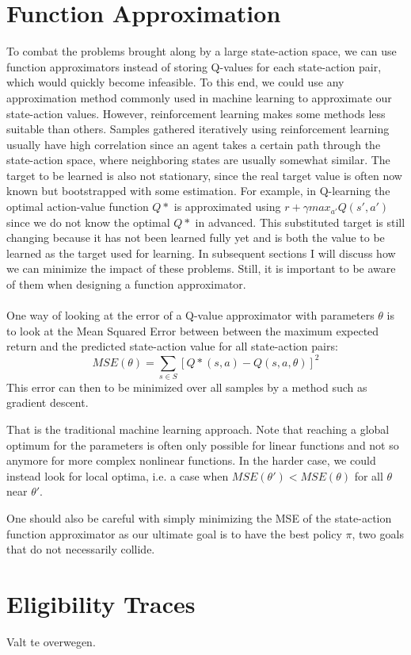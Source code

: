 \section{Function Approximation}
To combat the problems brought along by a large state-action space,
we can use function approximators instead of storing Q-values
for each state-action pair,
which would quickly become infeasible.
To this end,
we could use any approximation method commonly used in machine learning
to approximate our state-action values.
However, reinforcement learning makes some methods
less suitable than others.
Samples gathered iteratively using reinforcement learning
usually have high correlation since an agent
takes a certain path through
the state-action space,
where neighboring states are usually somewhat similar.
The target to be learned is also not stationary,
since the real target value is often now known
but bootstrapped with some estimation.
For example,
in Q-learning the optimal action-value function $Q*$
is approximated using $r+\gamma max_{a'}Q(s',a')$
since we do not know the optimal $Q*$ in advanced.
This substituted target is still changing
because it has not been learned fully yet
and is both the value to be learned
as the target used for learning.
In subsequent sections I will discuss
how we can minimize the impact of these problems.
Still, it is important to be aware of them
when designing a function approximator.

\paragraph{}
One way of looking at the error of a Q-value approximator
with parameters $\theta$ is to look at the Mean Squared Error
between between the maximum expected return and
the predicted state-action value for all state-action pairs:
$$MSE(\theta) = \sum_{s \in S}[Q*(s,a)-Q(s,a,\theta)]^2$$
This error can then to be minimized over all samples
by a method such as gradient descent.

That is the traditional machine learning approach.
Note that reaching a global optimum for the parameters
is often only possible for linear functions
and not so anymore for more complex nonlinear functions.
In the harder case, we could instead look for local optima,
i.e. a case when $MSE(\theta') < MSE(\theta)$
for all $\theta$ near $\theta'$.

One should also be careful with simply minimizing the MSE
of the state-action function approximator
as our ultimate goal is to have the best policy $\pi$,
two goals that do not necessarily collide.


\section{Eligibility Traces}
Valt te overwegen.
